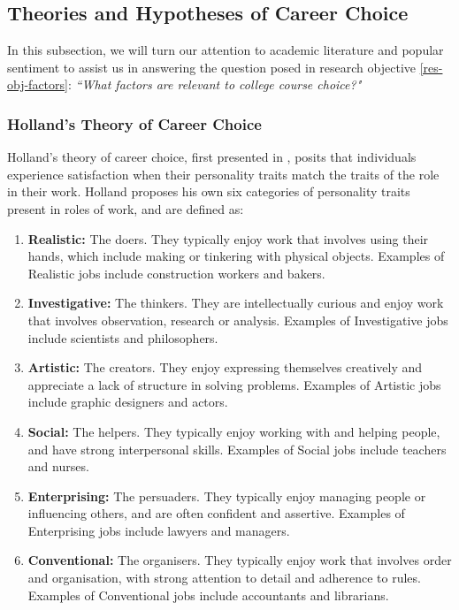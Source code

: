 \subsection{Theories and Hypotheses of Career Choice}
\label{sec:theories-college}

In this subsection, we will turn our attention to academic literature and popular sentiment
to assist us in answering the question posed in research objective \ref{res-obj-factors}:
\emph{``What factors are relevant to college course choice?"}

\subsubsection{Holland's Theory of Career Choice}

Holland's theory of career choice, first presented in \cite{holland1959theory}, 
posits that individuals experience satisfaction when their personality traits match 
the traits of the role in their work.
Holland proposes his own six categories of personality traits present in roles of work,
and are defined as:

\begin{enumerate}
    \item \textbf{Realistic:} The doers. They typically enjoy work that involves using their hands, which include making or tinkering with physical objects. Examples of Realistic jobs include construction workers and bakers.
    \item \textbf{Investigative:} The thinkers. They are intellectually curious and enjoy work that involves observation, research or analysis. Examples of Investigative jobs include scientists and philosophers.
    \item \textbf{Artistic:} The creators. They enjoy expressing themselves creatively and appreciate a lack of structure in solving problems. Examples of Artistic jobs include graphic designers and actors.
    \item \textbf{Social:} The helpers. They typically enjoy working with and helping people, and have strong interpersonal skills. Examples of Social jobs include teachers and nurses.
    \item \textbf{Enterprising:} The persuaders. They typically enjoy managing people or influencing others, and are often confident and assertive. Examples of Enterprising jobs include lawyers and managers.
    \item \textbf{Conventional:} The organisers. They typically enjoy work that involves order and organisation, with strong attention to detail and adherence to rules. Examples of Conventional jobs include accountants and librarians.
\end{enumerate}

